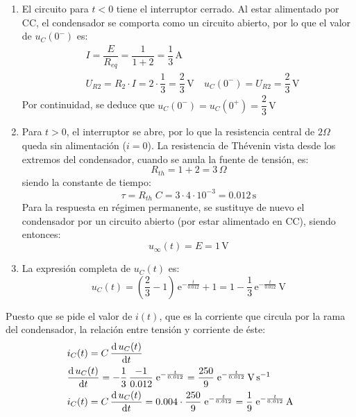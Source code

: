 \begin{enumerate}
    \item El circuito para $t<0$ tiene el interruptor cerrado. Al estar alimentado por CC, el condensador se comporta como un circuito abierto, por lo que el valor de $u_C(0^-)$ es:
    \begin{align*}
        &I=\dfrac{E}{R_{eq}}=\dfrac{1}{1+2}=\dfrac{1}{3}\,\si{\ampere}\\
        &U_{R2}=R_2\cdot I=2\cdot\dfrac{1}{3}=\dfrac{2}{3}\,\si{\volt}\
        &u_C(0^-)=U_{R2}=\dfrac{2}{3}\,\si{\volt}
    \end{align*}
    Por continuidad, se deduce que $u_C(0^-)=u_C(0^+)=\dfrac{2}{3} \,\si{\volt}$
    \item Para $t>0$, el interruptor se abre, por lo que la resistencia central de $2\Omega$ queda sin alimentación ($i=0$). La resistencia de Thévenin vista desde los extremos del condensador, cuando se anula la fuente de tensión, es:
    \begin{equation*}
        R_{th}=1+2=3\,\Omega
    \end{equation*}
    siendo la constante de tiempo:
    \begin{equation*}
        \tau=R_{th}\;C=3\cdot4\cdot10^{-3}=0.012\,\si{\second}
    \end{equation*}
    Para la respuesta en régimen permanente, se sustituye de nuevo el condensador por un circuito abierto (por estar alimentado en CC), siendo entonces:
    \begin{equation*}
        u_\infty(t)=E=1\,\si{\volt}
    \end{equation*}
    \item La expresión completa de $u_C(t)$ es:
    \begin{equation*}
        u_C(t)=\left(\dfrac{2}{3}-1 \right)\,\mathrm{e}^{-\frac{t}{0.012}}+1=1-\dfrac{1}{3}\,\mathrm{e}^{-\frac{t}{0.012}}\,\si{\volt}
    \end{equation*}
\end{enumerate}
Puesto que se pide el valor de $i(t)$, que es la corriente que circula por la rama del condensador, la relación entre tensión y corriente de éste:
\begin{align*}
    &i_C(t)=C\,\diff{\,u_C(t)}{t}\\
    &\diff{\,u_C(t)}{t}=-\dfrac{1}{3}\,\dfrac{-1}{0.012}\; \mathrm{e}^{-\frac{t}{0.012}}=\dfrac{250}{9}\; \mathrm{e}^{-\frac{t}{0.012}} \,\si{\volt\per\second}\\
    & i_C(t)=C\,\diff{\,u_C(t)}{t}=0.004\cdot \dfrac{250}{9}\; \mathrm{e}^{-\frac{t}{0.012}}=\dfrac{1}{9}\; \mathrm{e}^{-\frac{t}{0.012}} \,\si{\ampere}
\end{align*}

